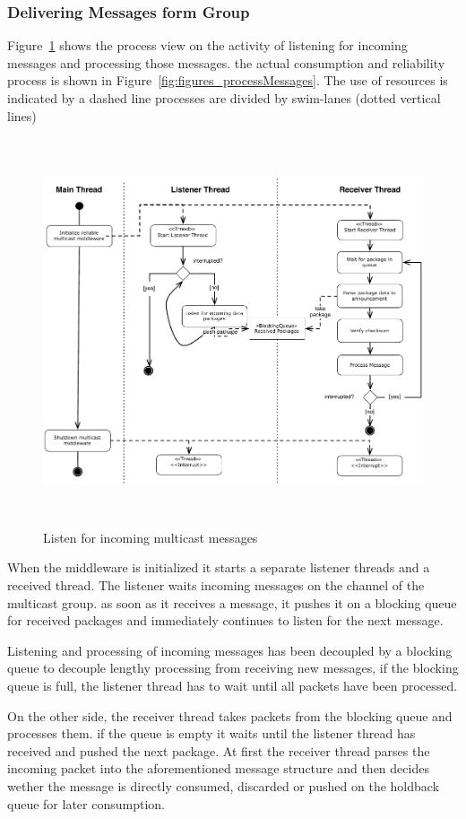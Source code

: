 \subsubsection{Delivering Messages form Group}
Figure~\ref{fig:figures_processReceivePackage} shows the process view on the activity of listening for incoming messages and processing those messages. the actual consumption and reliability process is shown in Figure~\ref{fig:figures_processMessages}.
The use of resources  is indicated by a dashed line 
processes are divided by swim-lanes (dotted vertical lines)
\begin{figure}[htbp]
    \centering
        \includegraphics[height=4.5in]{figures/receivePackets.pdf}
    \caption{Listen for incoming multicast messages}
    \label{fig:figures_processReceivePackage}
\end{figure}
When the middleware is initialized it starts a separate listener threads and a received thread. The listener waits incoming messages on the channel of the multicast group. as soon as it receives a message, it pushes it on a blocking queue for received packages and immediately continues to listen for the next message. 

Listening and processing of incoming messages has been decoupled by a blocking queue to decouple lengthy processing from receiving new messages, if the blocking queue is full, the listener thread has to wait until all packets have been processed. 

On the other side, the receiver thread takes packets from the blocking queue and processes them. if the queue is empty it  waits until the listener thread has received and pushed the next package. 
At first the receiver thread parses the incoming packet into the aforementioned message structure and then decides wether the message is directly consumed, discarded or pushed on the holdback queue for later consumption.

